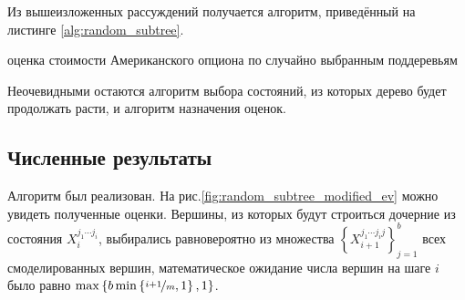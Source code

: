 Из вышеизложенных рассуждений получается алгоритм, приведённый на листинге \ref{alg:random_subtree}.
\IncMargin{1em}
\begin{algorithm}
  \caption{оценка стоимости Американского опциона по случайно выбранным поддеревьям}\label{alg:random_subtree}
\end{algorithm}\DecMargin{1em}

Неочевидными остаются алгоритм выбора состояний, из которых дерево будет продолжать расти, и алгоритм назначения оценок.
\subsection{Численные результаты}
Алгоритм был реализован. На рис.\ref{fig:random_subtree_modified_ev} можно увидеть полученные оценки. Вершины, из которых будут строиться дочерние из состояния $X_i^{j_1\cdots j_i}$, выбирались равновероятно из множества $\left\lbrace X_{i+1}^{j_1\cdots j_i j}\right\rbrace_{j=1}^b$ всех смоделированных вершин, математическое ожидание числа вершин на шаге $i$ было равно $\max\left\lbrace b\min\left\lbrace\nicefrac{i+1}{m}, 1\right\rbrace, 1\right\rbrace$.

